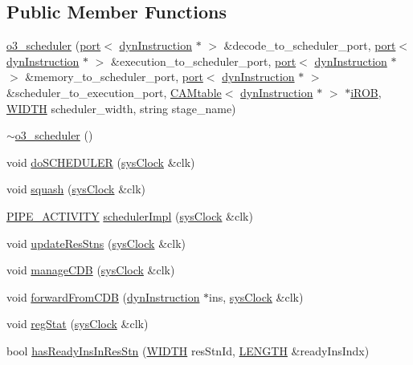 \subsection*{Public Member Functions}
\begin{DoxyCompactItemize}
\item 
\hyperlink{classo3__scheduler_a5aa72000043c2ff5cf065160560da9be}{o3\_\-scheduler} (\hyperlink{classport}{port}$<$ \hyperlink{classdynInstruction}{dynInstruction} $\ast$ $>$ \&decode\_\-to\_\-scheduler\_\-port, \hyperlink{classport}{port}$<$ \hyperlink{classdynInstruction}{dynInstruction} $\ast$ $>$ \&execution\_\-to\_\-scheduler\_\-port, \hyperlink{classport}{port}$<$ \hyperlink{classdynInstruction}{dynInstruction} $\ast$ $>$ \&memory\_\-to\_\-scheduler\_\-port, \hyperlink{classport}{port}$<$ \hyperlink{classdynInstruction}{dynInstruction} $\ast$ $>$ \&scheduler\_\-to\_\-execution\_\-port, \hyperlink{classCAMtable}{CAMtable}$<$ \hyperlink{classdynInstruction}{dynInstruction} $\ast$ $>$ $\ast$\hyperlink{backend_2parser_8cpp_ad73ae25f81e6e99482f3fbd5ba9664ce}{iROB}, \hyperlink{global_2global_8h_a6fa2e24b8a418fa215e183264cbea3aa}{WIDTH} scheduler\_\-width, string stage\_\-name)
\item 
\hyperlink{classo3__scheduler_ad9624ab36caacb50f844098a32b1fa94}{$\sim$o3\_\-scheduler} ()
\item 
void \hyperlink{classo3__scheduler_a336443d7d6e8f6b892c7c71b97099e40}{doSCHEDULER} (\hyperlink{classsysClock}{sysClock} \&clk)
\item 
void \hyperlink{classo3__scheduler_a53e17bdeda48c023a7f24e6871eeed4c}{squash} (\hyperlink{classsysClock}{sysClock} \&clk)
\item 
\hyperlink{unit_2stage_8h_ab00e4188e8b8974fecb1dfd12764cbb1}{PIPE\_\-ACTIVITY} \hyperlink{classo3__scheduler_ade8fe27e00ac0430122634af01c0639c}{schedulerImpl} (\hyperlink{classsysClock}{sysClock} \&clk)
\item 
void \hyperlink{classo3__scheduler_a3eaa3373cbbd123523a9cbf4d7326692}{updateResStns} (\hyperlink{classsysClock}{sysClock} \&clk)
\item 
void \hyperlink{classo3__scheduler_a5dfd1ae3623b060e60867808e78b224a}{manageCDB} (\hyperlink{classsysClock}{sysClock} \&clk)
\item 
void \hyperlink{classo3__scheduler_a13b34d2dae20e349ee7bb614d0d33d46}{forwardFromCDB} (\hyperlink{classdynInstruction}{dynInstruction} $\ast$ins, \hyperlink{classsysClock}{sysClock} \&clk)
\item 
void \hyperlink{classo3__scheduler_a3ca0bc2505c006ce212a82f58b243e43}{regStat} (\hyperlink{classsysClock}{sysClock} \&clk)
\item 
bool \hyperlink{classo3__scheduler_a46d9cb288bfbd52069935fa96d9de38f}{hasReadyInsInResStn} (\hyperlink{global_2global_8h_a6fa2e24b8a418fa215e183264cbea3aa}{WIDTH} resStnId, \hyperlink{global_2global_8h_ad7ec63c69447a2b630929c8e0197860d}{LENGTH} \&readyInsIndx)
\end{DoxyCompactItemize}


